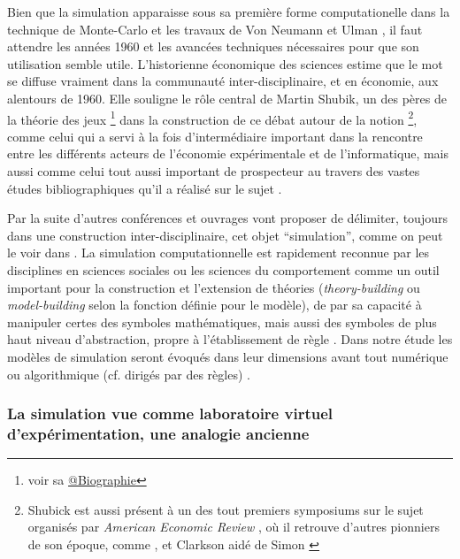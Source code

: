 Bien que la simulation apparaisse sous sa première forme computationelle dans la technique de Monte-Carlo et les travaux de Von Neumann et Ulman \autocite{Eckhardt1987}, il faut attendre les années 1960 et les avancées techniques nécessaires pour que son utilisation semble utile. L'historienne économique des sciences \textcite{Morgan2004} estime que le mot se diffuse vraiment dans la communauté inter-disciplinaire, et en économie, aux alentours de 1960. Elle souligne le rôle central de Martin Shubik, un des pères de la théorie des jeux \footnote{voir sa \href{http://blogs.library.duke.edu/rubenstein/2012/12/18/the-martin-shubik-papers-from-early-game-theory-to-the-strategic-analysis-of-war/}{@Biographie}} dans la construction de ce débat autour de la notion \footnote{Shubick est aussi présent à un des tout premiers symposiums sur le sujet organisés par \textit{American Economic Review} \autocite{Shubik1960b}, où il retrouve d'autres pionniers de son époque, comme \textcite{Orcutt1960}, et Clarkson aidé de Simon \autocite{Clarkson1960}}, comme celui qui a servi à la fois d'intermédiaire important dans la rencontre entre les différents acteurs de l'économie expérimentale et de l'informatique, mais aussi comme celui tout aussi important de prospecteur au travers des vastes études bibliographiques qu'il a réalisé sur le sujet \autocite{Shubik1960a, Shubik1972} \autocite{Morgan2004}.

Par la suite d'autres conférences et ouvrages vont proposer de délimiter, toujours dans une construction inter-disciplinaire, cet objet \enquote{simulation}, comme on peut le voir dans \autocite{Guetzkow1962, Borko1962, Guetzkow1972, Dutton1971}. La simulation computationnelle est rapidement reconnue par les disciplines en sciences sociales ou les sciences du comportement comme un outil important pour la construction et l'extension de théories (\textit{theory-building} ou \textit{model-building} selon la fonction définie pour le modèle), de par sa capacité à manipuler certes des symboles mathématiques, mais aussi des symboles de plus haut niveau d'abstraction, propre à l'établissement de règle \autocite[924-925]{Clarkson1960}. Dans notre étude les modèles de simulation seront évoqués dans leur dimensions avant tout numérique ou algorithmique (cf. dirigés par des règles) \autocite[36-38]{Varenne2013}.

\subsubsection{La simulation vue comme laboratoire virtuel d'expérimentation, une analogie ancienne}
\label{ssec:labo_virtuelle}

